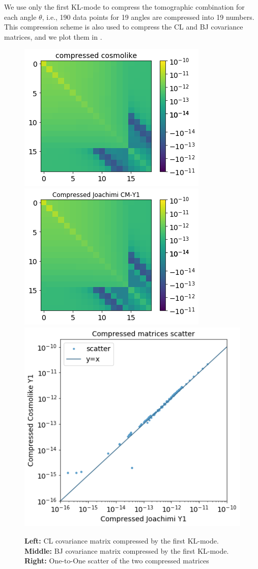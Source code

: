 \documentclass[twocolumn]{\docclass}
\begin{document}
	We use only the first KL-mode to compress the tomographic combination for each angle $\theta$, i.e., 190 data points for 19 angles are compressed into 19 numbers.  This compression scheme is also used to compress the CL and BJ covariance matrices, and we plot them in .
	
	\begin{figure}
		\includegraphics[width=0.68\columnwidth]{kl_comp_cl.png}
		\includegraphics[width=0.68\columnwidth]{kl_comp_bj.png}
		\includegraphics[width=0.54\columnwidth]{kl_scatter.png}
		\caption{\textbf{Left:} CL covariance matrix compressed by the first KL-mode. \textbf{Middle:} BJ covariance matrix compressed by the first KL-mode. \textbf{Right:}  One-to-One scatter of the two compressed matrices \label{fig:comp-cov}}
	\end{figure}
	
\end{document}
